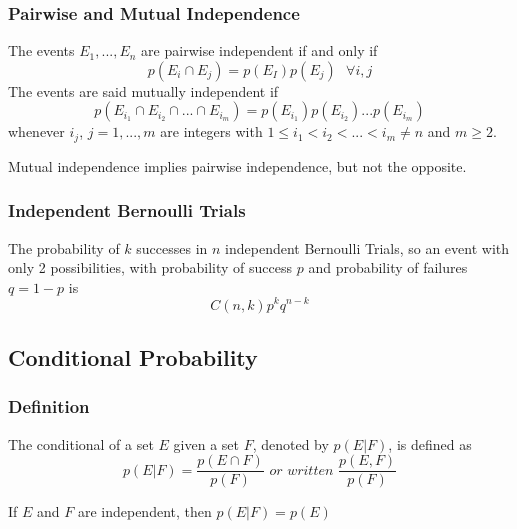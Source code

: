 \documentclass{article}
\begin{document}
\subsubsection{Pairwise and Mutual Independence} The events $ E_1,...,E_n $ are pairwise independent if and only if
\begin{equation}
p(E_i \cap E_j) = p(E_I)p(E_j) \textit{ } \forall i,j
\end{equation}
The events are said mutually independent if
\begin{equation}
p(E_{i_{1}} \cap E_{i_{2}} \cap ... \cap E_{i_{m}}) = p(E_{i_{1}})p(E_{i_{2}})...p(E_{i_{m}})
\end{equation}
whenever $ i_j $, $ j = 1,...,m $ are integers with $ 1 \leq i_1 < i_2 < ... < i_m \neq n $ and $ m \geq 2 $.

\begin{tcolorbox}[width=12.1cm, leftrule=3mm]
Mutual independence implies pairwise independence, but not the opposite.
\end{tcolorbox}

\subsubsection{Independent Bernoulli Trials} The probability of $ k $ successes in $ n $ independent Bernoulli Trials, so an event with only 2 possibilities, with probability of success $ p $ and probability of failures $ q = 1 - p $ is
\begin{equation}
C(n,k)p^kq^{n-k}
\end{equation}


\subsection{Conditional Probability}
\subsubsection{Definition} The conditional of a set $ E $ given a set $ F $, denoted by $ p(E | F) $, is defined as
\begin{equation}
p(E | F) = \frac{p(E \cap F)}{p(F)} \textit{ or written } \frac{p(E,F)}{p(F)}
\end{equation}

\begin{tcolorbox}[width=12.1cm, leftrule=3mm]
If $ E $ and $ F $ are independent, then $ p(E | F) = p(E) $
\end{tcolorbox}
\end{document}
